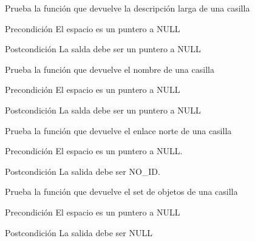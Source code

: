 \begin{DoxyRefList}
\item[\label{test__test000280}%
\hypertarget{test__test000280}{}%
Global \hyperlink{space__test_8c_a102af2c9cd571ef59b393a93ecde63aa}{test2\-\_\-space\-\_\-get\-\_\-long\-\_\-description} ()]Prueba la función que devuelve la descripción larga de una casilla \begin{DoxyPrecond}{Precondición}
El espacio es un puntero a N\-U\-L\-L 
\end{DoxyPrecond}
\begin{DoxyPostcond}{Postcondición}
La salda debe ser un puntero a N\-U\-L\-L  
\end{DoxyPostcond}

\item[\label{test__test000274}%
\hypertarget{test__test000274}{}%
Global \hyperlink{space__test_8c_aee88ed31c63efc674051a4563aed86e2}{test2\-\_\-space\-\_\-get\-\_\-name} ()]Prueba la función que devuelve el nombre de una casilla \begin{DoxyPrecond}{Precondición}
El espacio es un puntero a N\-U\-L\-L 
\end{DoxyPrecond}
\begin{DoxyPostcond}{Postcondición}
La salda debe ser un puntero a N\-U\-L\-L  
\end{DoxyPostcond}

\item[\label{test__test000287}%
\hypertarget{test__test000287}{}%
Global \hyperlink{space__test_8c_a61891c9cebb9d26dc9f149ad8341517c}{test2\-\_\-space\-\_\-get\-\_\-north} ()]Prueba la función que devuelve el enlace norte de una casilla \begin{DoxyPrecond}{Precondición}
El espacio es un puntero a N\-U\-L\-L. 
\end{DoxyPrecond}
\begin{DoxyPostcond}{Postcondición}
La salida debe ser N\-O\-\_\-\-I\-D.  
\end{DoxyPostcond}

\item[\label{test__test000285}%
\hypertarget{test__test000285}{}%
Global \hyperlink{space__test_8c_ae9aec87526c060b4fd22ca1928c1cb22}{test2\-\_\-space\-\_\-get\-\_\-objects} ()]Prueba la función que devuelve el set de objetos de una casilla \begin{DoxyPrecond}{Precondición}
El espacio es un puntero a N\-U\-L\-L 
\end{DoxyPrecond}
\begin{DoxyPostcond}{Postcondición}
La salida debe ser N\-U\-L\-L  
\end{DoxyPostcond}


\end{DoxyRefList}

